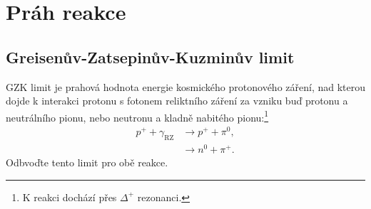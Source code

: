 \section{Práh reakce}
\subsection{Greisenův-Zatsepinův-Kuzminův limit}
    GZK limit je prahová hodnota energie kosmického protonového záření, nad kterou dojde k interakci protonu s fotonem reliktního záření za vzniku buď protonu a neutrálního pionu, nebo neutronu a kladně nabitého pionu:\footnote{
        K reakci dochází přes $\Delta^{+}$ rezonanci.
    }
    \begin{subequations}
        \begin{align}
            p^{+}+\gamma_{\mathrm{RZ}}
                &\longrightarrow p^{+}+\pi^{0},\\
                &\longrightarrow n^{0}+\pi^{+}.
        \end{align}        
    \end{subequations}
    Odbvoďte tento limit pro obě reakce.
